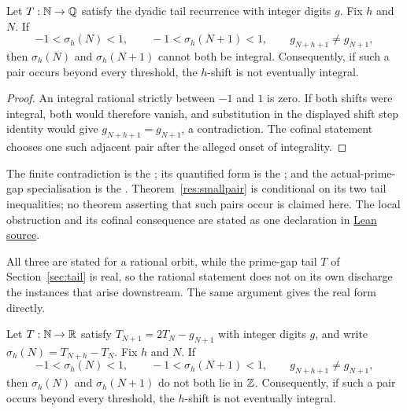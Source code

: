 \documentclass[11pt]{article}
\begin{document}
\begin{theorem}\label{res:smallpair}
Let $T:\mathbb{N}\to\mathbb{Q}$ satisfy the dyadic tail recurrence with integer digits $g$.
Fix $h$ and $N$.  If
\[
 -1<\sigma_h(N)<1,\qquad -1<\sigma_h(N+1)<1,
 \qquad g_{N+h+1}\ne g_{N+1},
\]
then $\sigma_h(N)$ and $\sigma_h(N+1)$ cannot both be integral.
Consequently, if such a pair occurs beyond every threshold, the $h$-shift is
not eventually integral.
\end{theorem}

\begin{proof}
An integral rational strictly between $-1$ and $1$ is zero.  If both shifts
were integral, both would therefore vanish, and substitution in the displayed
shift step identity would give $g_{N+h+1}=g_{N+1}$, a contradiction.  The
cofinal statement chooses one such adjacent pair after the alleged onset of
integrality.
\end{proof}

\noindent The finite contradiction is the
; its quantified form is the
; and the actual-prime-gap specialisation is the
.  Theorem~\ref{res:smallpair} is conditional on its two tail
inequalities; no theorem asserting that such pairs occur is claimed here.  The
local obstruction and its cofinal consequence are stated as one declaration in
\href{https://github.com/wcook04/plectis-erdos/blob/f36a98bf3d3e6f65f1074e3b800e3293d5b8a51a/ErdosProblems/Erdos251/PaperCoreR7.lean#L267}{Lean source}.

All three are stated for a rational orbit, while the prime-gap tail
$T$ of Section~\ref{sec:tail} is real, so the rational statement does
not on its own discharge the instances that arise downstream.  The same
argument gives the real form directly.

\begin{corollary}\label{res:smallpair-real}
Let $T:\mathbb{N}\to\mathbb{R}$ satisfy $T_{N+1}=2T_N-g_{N+1}$ with integer digits $g$, and
write $\sigma_h(N)=T_{N+h}-T_N$.  Fix $h$ and $N$.  If
\[
 -1<\sigma_h(N)<1,\qquad -1<\sigma_h(N+1)<1,
 \qquad g_{N+h+1}\ne g_{N+1},
\]
then $\sigma_h(N)$ and $\sigma_h(N+1)$ do not both lie in $\mathbb{Z}$.
Consequently, if such a pair occurs beyond every threshold, the $h$-shift is
not eventually integral.
\end{corollary}
\end{document}
